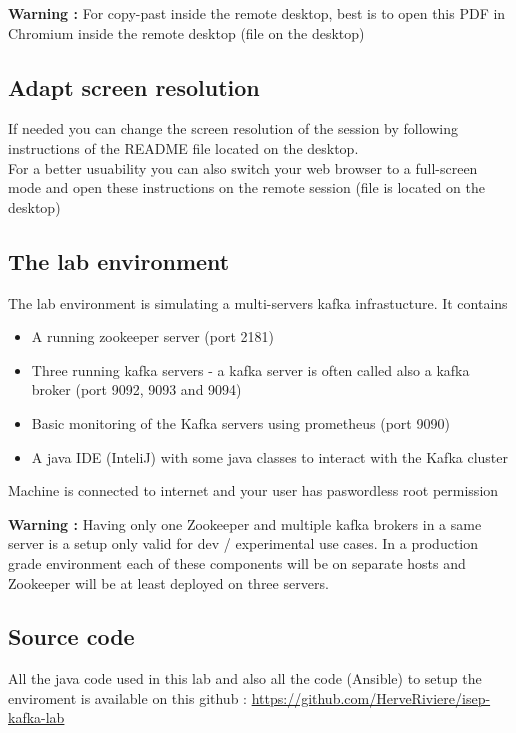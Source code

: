 \documentclass{article}
\newenvironment{warning}
    { \begin{mdframed}[backgroundcolor=blue!20] \textbf{Warning : } }
    {  \end{mdframed}}
\begin{document}
\begin{warning}
For copy-past inside the remote desktop, best is to open this PDF in Chromium inside the remote desktop (file on the desktop)
\end{warning}

\subsection{Adapt screen resolution}
If needed you can change the screen resolution of the session by following instructions of the README file located on the desktop. \\
For a better usuability you can also switch your web browser to a full-screen mode and open these instructions on the remote session (file is located on the desktop)

\subsection{The lab environment}

The lab environment is simulating a multi-servers kafka infrastucture. It contains 
\begin{itemize}
\item A running zookeeper server (port 2181)
\item Three running kafka servers - a kafka server is often called also a kafka broker  (port 9092, 9093 and 9094)
\item Basic monitoring of the Kafka servers using prometheus (port 9090) 
\item A java IDE (InteliJ) with some java classes to interact with the Kafka cluster
\end{itemize}

Machine is connected to internet and your user has paswordless root permission

\begin{warning}
Having only one Zookeeper and multiple kafka brokers in a same server is a setup only valid for dev / experimental use cases. In a production grade environment each of these components will be on separate hosts and Zookeeper will be at least deployed on three servers.
\end{warning}

\subsection{Source code}
All the java code used in this lab and also all the code (Ansible) to setup the enviroment is available on this github : \href{https://github.com/HerveRiviere/isep-kafka-lab}{https://github.com/HerveRiviere/isep-kafka-lab}
\end{document}
